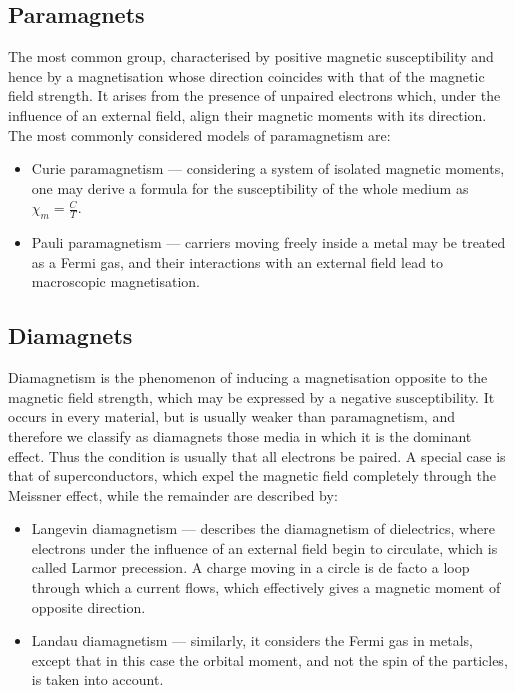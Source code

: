 \subsection{Paramagnets}

The most common group, characterised by positive magnetic susceptibility and hence by a magnetisation whose direction coincides with that of the magnetic field strength. It arises from the presence of unpaired electrons which, under the influence of an external field, align their magnetic moments with its direction. The most commonly considered models of paramagnetism are:

\begin{itemize}
    \item Curie paramagnetism --- considering a system of isolated magnetic moments, one may derive a formula for the susceptibility of the whole medium as $\chi_m = \frac{C}{T}$.
    \item Pauli paramagnetism --- carriers moving freely inside a metal may be treated as a Fermi gas, and their interactions with an external field lead to macroscopic magnetisation.
\end{itemize}

\subsection{Diamagnets}

Diamagnetism is the phenomenon of inducing a magnetisation opposite to the magnetic field strength, which may be expressed by a negative susceptibility. It occurs in every material, but is usually weaker than paramagnetism, and therefore we classify as diamagnets those media in which it is the dominant effect. Thus the condition is usually that all electrons be paired. A special case is that of superconductors, which expel the magnetic field completely through the Meissner effect, while the remainder are described by:

\begin{itemize}
    \item Langevin diamagnetism --- describes the diamagnetism of dielectrics, where electrons under the influence of an external field begin to circulate, which is called Larmor precession. A charge moving in a circle is de facto a loop through which a current flows, which effectively gives a magnetic moment of opposite direction.
    \item Landau diamagnetism --- similarly, it considers the Fermi gas in metals, except that in this case the orbital moment, and not the spin of the particles, is taken into account.
\end{itemize}

